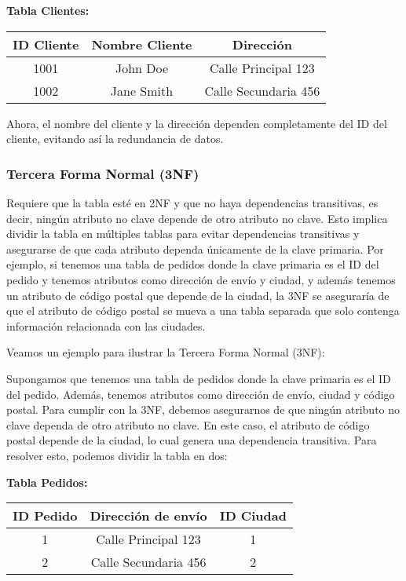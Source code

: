 \documentclass[executivepaper]{article}
\begin{document}
\textbf{Tabla Clientes:}
\begin{center}
\begin{tabular}{|c|c|c|}
\hline
\textbf{ID Cliente} & \textbf{Nombre Cliente} & \textbf{Dirección} \\
\hline
1001 & John Doe & Calle Principal 123 \\
\hline
1002 & Jane Smith & Calle Secundaria 456 \\
\hline
\end{tabular}
\end{center}

Ahora, el nombre del cliente y la dirección dependen completamente del ID del cliente, evitando así la redundancia de datos.

\subsubsection*{Tercera Forma Normal (3NF)}

Requiere que la tabla esté en 2NF y que no haya dependencias transitivas, es decir, ningún atributo no clave depende de otro atributo no clave. Esto implica dividir la tabla en múltiples tablas para evitar dependencias transitivas y asegurarse de que cada atributo dependa únicamente de la clave primaria. Por ejemplo, si tenemos una tabla de pedidos donde la clave primaria es el ID del pedido y tenemos atributos como dirección de envío y ciudad, y además tenemos un atributo de código postal que depende de la ciudad, la 3NF se aseguraría de que el atributo de código postal se mueva a una tabla separada que solo contenga información relacionada con las ciudades.

Veamos un ejemplo para ilustrar la Tercera Forma Normal (3NF):

Supongamos que tenemos una tabla de pedidos donde la clave primaria es el ID del pedido. Además, tenemos atributos como dirección de envío, ciudad y código postal. Para cumplir con la 3NF, debemos asegurarnos de que ningún atributo no clave dependa de otro atributo no clave. En este caso, el atributo de código postal depende de la ciudad, lo cual genera una dependencia transitiva. Para resolver esto, podemos dividir la tabla en dos:

\textbf{Tabla Pedidos:}
\begin{center}
\begin{tabular}{|c|c|c|}
\hline
\textbf{ID Pedido} & \textbf{Dirección de envío} & \textbf{ID Ciudad} \\
\hline
1 & Calle Principal 123 & 1 \\
\hline
2 & Calle Secundaria 456 & 2 \\
\hline
\end{tabular}
\end{center}
\end{document}
